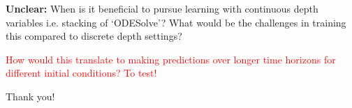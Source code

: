 \documentclass[usenames,dvipsnames]{beamer}
\theoremstyle{definition}
\begin{document}

\begin{frame}
\textbf{Unclear:} When is it beneficial to pursue learning with continuous depth variables i.e. stacking of `ODESolve'? What would be the challenges in training this compared to discrete depth settings?


\textcolor{red}{How would this translate to making predictions over longer time horizons for different initial conditions? To test!}

\end{frame}



\begin{frame}{}
\begin{center}
    \Large{Thank you!}
\end{center}
        
\end{frame}
\end{document}
